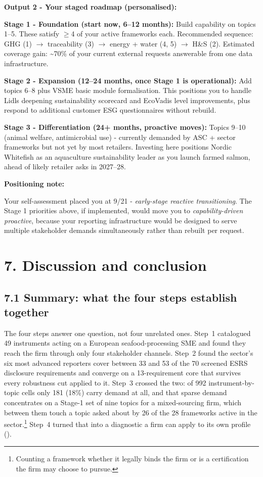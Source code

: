 \documentclass[
]{article}
\begin{document}
\textbf{Output 2 - Your staged roadmap (personalised):}

\textbf{Stage 1 - Foundation (start now, 6--12 months):} Build
capability on topics 1--5. These satisfy $\geq$4 of your active frameworks
each. Recommended sequence: GHG (1) $\to$ traceability (3) $\to$ energy + water
(4, 5) $\to$ H\&S (2). Estimated coverage gain: \textasciitilde70\% of your
current external requests answerable from one data infrastructure.

\textbf{Stage 2 - Expansion (12--24 months, once Stage 1 is
operational):} Add topics 6--8 plus VSME basic module formalisation.
This positions you to handle Lidl\textquotesingle s deepening
sustainability scorecard and EcoVadis level improvements, plus respond
to additional customer ESG questionnaires without rebuild.

\textbf{Stage 3 - Differentiation (24+ months, proactive moves):}
Topics 9--10 (animal welfare, antimicrobial use) - currently demanded
by ASC + sector frameworks but not yet by most retailers. Investing here
positions Nordic Whitefish as an aquaculture sustainability leader as
you launch farmed salmon, ahead of likely retailer asks in 2027--28.

\textbf{Positioning note:}

Your self-assessment placed you at 9/21 - \emph{early-stage reactive
transitioning}. The Stage 1 priorities above, if implemented, would move
you to \emph{capability-driven proactive}, because your reporting
infrastructure would be designed to serve multiple stakeholder demands
simultaneously rather than rebuilt per request.
\clearpage
\fi %

\section{7. Discussion and conclusion}\label{discussion}

\subsection{7.1 Summary: what the four steps establish
together}\label{discussion-summary}

The four steps answer one question, not four unrelated ones. Step~1 catalogued 49
instruments acting on a European seafood-processing SME and found they reach the
firm through only four stakeholder channels. Step~2 found the sector's six most
advanced reporters cover between 33 and 53 of the 70 screened ESRS disclosure
requirements and converge on a 13-requirement core that survives every robustness
cut applied to it. Step~3 crossed the two: of 992 instrument-by-topic cells only
181 (18\%) carry demand at all, and that sparse demand concentrates on a Stage-1
set of nine topics for a mixed-sourcing firm, which between them touch a topic
asked about by 26 of the 28 frameworks active in the sector.\footnote{Counting a
framework whether it legally binds the firm or is a certification the firm may
choose to pursue.} Step~4 turned that into a diagnostic a firm can apply to its own
profile ().
\end{document}

